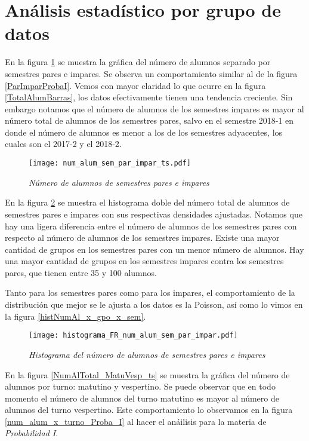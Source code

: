 \section{Análisis estadístico por grupo de datos} \label{AE_x_GpoDeDatos}

En la figura \ref{NumAlTotal_ParImpar_ts} se muestra la gráfica del número de alumnos separado por semestres pares e impares. Se observa un comportamiento similar al de la figura \ref{ParImparProbaI}. Vemos con mayor claridad lo que ocurre en la figura \ref{TotalAlumBarras}, los datos efectivamente tienen una tendencia creciente. Sin embargo notamos que el número de alumnos de los semestres impares es mayor al número total de alumnos de los semestres pares, salvo en el semestre 2018-1 en donde el número de alumnos es menor a los de los semestres adyacentes, los cuales son el 2017-2 y el 2018-2.

\begin{figure}[H]
\centering
\texttt{[image: num\_alum\_sem\_par\_impar\_ts.pdf]} %
\caption{\textit{Número de alumnos de semestres pares e impares}}\label{NumAlTotal_ParImpar_ts}
\end{figure}


En la figura \ref{histNumAlTotal_ParImpar} se muestra el histograma doble del número total de alumnos de semestres pares e impares con sus respectivas densidades ajustadas. Notamos que hay una ligera diferencia entre el número de alumnos de los semestres pares con respecto al número de alumnos de los semestres impares. Existe una mayor cantidad de grupos en los semestres pares con un menor número de alumnos. Hay una mayor cantidad de grupos en los semestres impares contra los semestres pares, que tienen entre 35 y 100 alumnos.

Tanto para los semestres pares como para los impares, el comportamiento de la distribución que mejor se le ajusta a los datos es la Poisson, así como lo vimos en la figura \ref{histNumAl_x_gpo_x_sem}.

\begin{figure}[H]
\centering
\texttt{[image: histograma\_FR\_num\_alum\_sem\_par\_impar.pdf]} %
\caption{\textit{Histograma del número de alumnos de semestres pares e impares}}\label{histNumAlTotal_ParImpar}
\end{figure}


En la figura \ref{NumAlTotal_MatuVesp_ts} se muestra la gráfica del número de alumnos por turno: matutino y vespertino. Se puede observar que en todo momento el número de alumnos del turno matutino es mayor al número de alumnos del turno vespertino. Este comportamiento lo observamos en la figura \ref{num_alum_x_turno_Proba_I} al hacer el anáilisis para la materia de \textit{Probabilidad I}.


